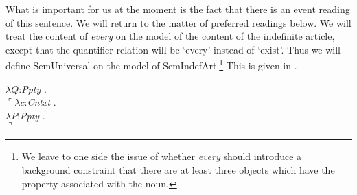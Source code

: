 What is important for us at the moment is the fact that there is an
event reading of this sentence.  We will return to the matter of
preferred readings below. We will treat the content of \textit{every}
on the model of the content of the indefinite article, except that the
quantifier relation will be `every' instead of `exist'.  Thus we will
define SemUniversal on the model of SemIndefArt.\footnote{We leave to one side the
  issue of whether \textit{every} should introduce a background
  constraint that there are at least three objects which have the
  property associated with the noun.}  This is given in \nexteg{}.
\begin{ex} 

  $\lambda Q$:\textit{Ppty} . \\
  \hspace*{1em}$\ulcorner\lambda c$:\textit{Cntxt} . \\
  \hspace*{2em}$\lambda P$:\textit{Ppty} . \\
  \hspace*{3em}$\urcorner$
\end{ex} 
   


